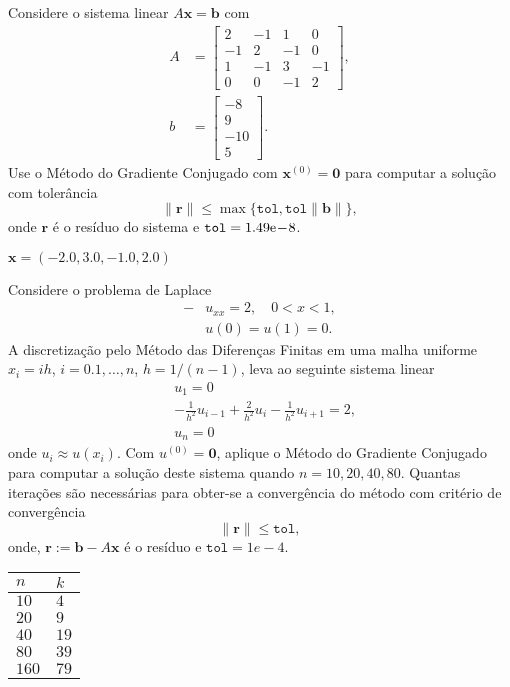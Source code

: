 \begin{exer}
  Considere o sistema linear $A\pmb{x} = \pmb{b}$ com
  \begin{align}
    A &=
    \begin{bmatrix}
      2 & -1 & 1 & 0\\
      -1 & 2 & -1 & 0\\
      1 & -1 & 3 & -1 \\
      0 & 0 & -1 & 2
    \end{bmatrix},\\
    b &=
    \begin{bmatrix}
      -8\\
      9\\
      -10\\
      5
    \end{bmatrix}.
  \end{align}
  Use o Método do Gradiente Conjugado com $\pmb{x}^{(0)} = \pmb{0}$ para computar a solução com tolerância
  \begin{equation}
    \|\pmb{r}\| \leq \max\{\texttt{tol}, \texttt{tol}\|\pmb{b}\|\},
  \end{equation}
  onde $\pmb{r}$ é o resíduo do sistema e $\texttt{tol} = 1.49\mathrm{e}\!-\!8$.
\end{exer}
\begin{resp}
  $\pmb{x} = \left(-2.0, 3.0, -1.0, 2.0\right)$
\end{resp}

\begin{exer}
  Considere o problema de Laplace
  \begin{align}
    -&u_{xx} = 2,\quad 0 < x < 1,\\
     &u(0) = u(1) = 0.
  \end{align}
  A discretização pelo Método das Diferenças Finitas em uma malha uniforme $x_i = ih$, $i=0.1,\dotsc,n$, $h=1/(n-1)$, leva ao seguinte sistema linear
  \begin{align}
    &u_1 = 0\\
    &-\frac{1}{h^2}u_{i-1} + \frac{2}{h^2}u_{i} - \frac{1}{h^2}u_{i+1} = 2,\\
    &u_n = 0
  \end{align}
  onde $u_i \approx u(x_i)$. Com $u^{(0)} = \pmb{0}$, aplique o Método do Gradiente Conjugado para computar a solução deste sistema quando $n=10, 20, 40, 80$. Quantas iterações são necessárias para obter-se a convergência do método com critério de convergência
  \begin{equation}
    \|\pmb{r}\| \leq \texttt{tol},
  \end{equation}
  onde, $\pmb{r} := \pmb{b} - A\pmb{x}$ é o resíduo e $\texttt{tol} = 1e-4$.
\end{exer}
\begin{resp}
  \begin{tabular}{ll}
    $n$ & $k$\\\hline
    $10$ & $4$\\
    $20$ & $9$\\
    $40$ & $19$\\
    $80$ & $39$\\
    $160$ & $79$
  \end{tabular}
\end{resp}

